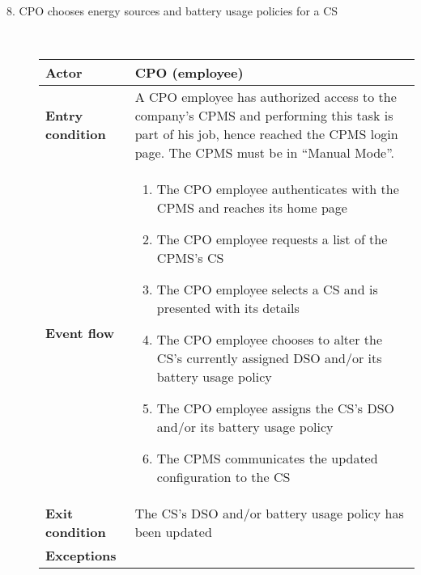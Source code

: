 \documentclass[11pt]{article}
\begin{document}
\begin{description}
    \item [8. CPO chooses energy sources and battery usage policies for a CS] \hfill \\
    \begin{table}[H]
        \centering
        \setlength{\tabcolsep}{18pt}
        \renewcommand{\arraystretch}{1.4}
        \begin{tabularx}{\textwidth}{|>{\hsize=0.5\hsize}X|>{\hsize=1.5\hsize}X|}
            \hline
            \textbf{Actor} & CPO (employee) \\
            \hline
            \textbf{Entry condition} & A CPO employee has authorized access to the company's CPMS and performing this task is part of his job, hence reached the CPMS login page. The CPMS must be in “Manual Mode”. \\
            \hline
            \textbf{Event flow} & 
                \begin{minipage}[t]{\hsize}
                \begin{enumerate}[topsep=0pt, leftmargin=*]
                    \item The CPO employee authenticates with the CPMS and reaches its home page
                    \item The CPO employee requests a list of the CPMS's CS
                    \item The CPO employee selects a CS and is presented with its details
                    \item The CPO employee chooses to alter the CS's currently assigned DSO and/or its battery usage policy
                    \item The CPO employee assigns the CS's DSO and/or its battery usage policy
                    \item The CPMS communicates the updated configuration to the CS
                \end{enumerate}
                \end{minipage}
                \vspace{6pt}
            \\
            \hline
            \textbf{Exit condition} & The CS's DSO and/or battery usage policy has been updated \\
            \hline
            \textbf{Exceptions} & 
                \begin{minipage}[t]{\hsize}

\end{minipage}
\end{tabularx}
\end{table}
\end{description}
\end{document}

